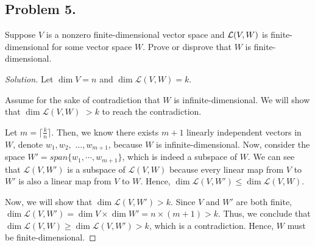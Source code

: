 \documentclass{article}
\begin{document}
\newpage
\subsection*{Problem 5.}
Suppose $V$ is a nonzero finite-dimensional vector space and ${\cal L} (V,W)$ is finite-dimensional 
for some vector space $W$. Prove or disprove that $W$ is finite-dimensional.

\begin{proof}[Solution]
    Let $\dim V = n$ and $\dim\mathcal{L}(V,W) = k$.

    Assume for the sake of contradiction that $W$ is infinite-dimensional. We will show that 
    $\dim\mathcal{L}(V,W)$ $> k$ to reach the contradiction.

    Let $m = \lceil{\frac{k}{n}}\rceil$. Then, we know there exists $m+1$ linearly independent vectors 
    in $W$, denote $w_1, w_2,$ $\ldots, w_{m+1}$, because $W$ is infinite-dimensional. Now, consider 
    the space $W' = span\{w_1, \cdots, w_{m+1}\}$, which is indeed a subspace of $W$. We can see 
    that $\mathcal{L}(V,W')$ is a subspace of $\mathcal{L}(V,W)$ because every linear map from 
    $V$ to $W'$ is also a linear map from $V$ to $W$. Hence, $\dim\mathcal{L}(V,W') \leq 
    \dim\mathcal{L}(V,W)$.

    Now, we will show that $\dim\mathcal{L}(V,W') > k$. Since $V$ and $W'$ are both finite, 
    $\dim \mathcal{L}(V,W') = \dim V \times \dim W' = n \times (m+1) > k$. Thus, we conclude that 
    $\dim\mathcal{L}(V,W) \ge \dim\mathcal{L}(V,W') > k$, which is a contradiction. Hence, $W$ must 
    be finite-dimensional.
\end{proof}
\end{document}
